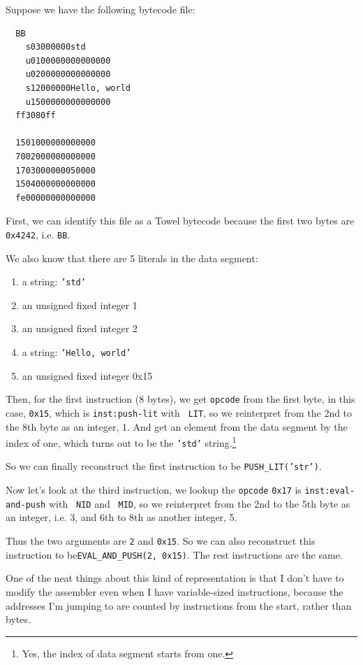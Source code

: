 \documentclass{report}
\newcommand{\mtilde}[1]{\textasciitilde}
\newcommand{\marg}[1]{\texttt{\mtilde ~#1}}
\newcommand{\inst}[1] {\texttt{inst:#1}}
\begin{document}
\begin{mdframed}[style=example]
  Suppose we have the following bytecode file:

\begin{verbatim}
  BB
    s03000000std
    u0100000000000000
    u0200000000000000
    s12000000Hello, world
    u1500000000000000
  ff3080ff

  1501000000000000
  7002000000000000
  1703000000050000
  1504000000000000
  fe00000000000000
\end{verbatim}

First, we can identify this file as a Towel bytecode because the first two bytes are \texttt{0x4242}, i.e. \texttt{BB}.

We also know that there are 5 literals in the data segment:
\begin{enumerate}
\item a string: \texttt{'std'}
\item an unsigned fixed integer 1
\item an unsigned fixed integer 2
\item a string: \texttt{'Hello, world'}
\item an unsigned fixed integer 0x15
\end{enumerate}

Then, for the first instruction (8 bytes), we get \texttt{opcode} from the first byte, in this case, \texttt{0x15}, which is \inst{push-lit} with \marg{LIT}, so we reinterpret from the 2nd to the 8th byte as an integer, 1. And get an element from the data segment by the index of one, which turns out to be the \texttt{'std'} string.\footnote{Yes, the index of data segment starts from one.}

So we can finally reconstruct the first instruction to be \texttt{PUSH\_LIT('str')}.

Now let's look at the third instruction, we lookup the \texttt{opcode} \texttt{0x17} is \inst{eval-and-push} with \marg{NID} and \marg{MID}, so we reinterpret from the 2nd to the 5th byte as an integer, i.e. 3, and 6th to 8th as another integer, 5.

Thus the two arguments are \texttt{2} and \texttt{0x15}. So we can also reconstruct this instruction to be\newline \texttt{EVAL\_AND\_PUSH(2, 0x15)}. The rest instructions are the same.

\end{mdframed}

\begin{mdframed}[style=detail]
  One of the neat things about this kind of representation is that I don't have to modify the assembler even when I have variable-sized instructions, because the addresses I'm jumping to are counted by instructions from the start, rather than bytes.
\end{mdframed}
\end{document}
